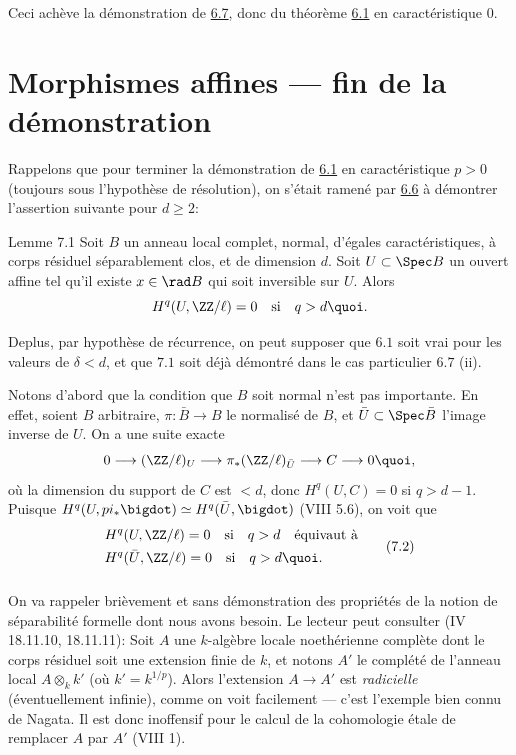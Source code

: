 \documentclass[10pt]{../fichiers-configuration-latex/smfart}
\begin{document}
Ceci achève la démonstration de \hyperref[XIX.lem6.7]{6.7}, donc du théorème \hyperref[XIX.thm6.1]{6.1} en
caractéristique 0.

\section{Morphismes affines --- fin de la démonstration}

Rappelons que pour terminer la démonstration de \hyperref[XIX.thm6.1]{6.1} en caractéristique
$p>0$ (toujours sous l'hypothèse de résolution), on s'était ramené par
\hyperref[XIX.lem6.6]{6.6} à démontrer l'assertion suivante pour $d\geq 2$:

\begin{enonce*}{Lemme 7.1}
Soit $B$ un anneau local complet, normal, d'égales caractéristiques, à
corps résiduel séparablement clos, et de dimension $d$. Soit $U\subset
\Spec B$ un ouvert affine tel qu'il existe $x\in \rad B$ qui soit
inversible sur $U$. Alors 
$$
H^{q}(U,\ZZ/\ell)=0\quad\text{\rm si}\quad q>d{\quoi}.
$$

De\pageoriginale plus, par hypothèse de récurrence, on peut supposer 
que $6.1$ soit vrai pour les valeurs de $\delta<d$, et que $7.1$ soit déjà démontré
dans le cas particulier $6.7$ {\rm (ii)}.
\end{enonce*}

Notons d'abord que la condition que $B$ soit normal n'est pas
importante. En effet, soient $B$ arbitraire, $\pi:\bar{B}\rightarrow
B$ le normalisé de $B$, et $\bar{U}\subset\Spec \bar{B}$ l'image
inverse de $U$. On a une suite exacte
$$
0\longrightarrow (\ZZ/\ell)_{U}\longrightarrow
\pi_{\ast}(\ZZ/\ell)_{\bar{U}}\longrightarrow C\longrightarrow
0{\quoi},
$$
où la dimension du support de $C$ est $<d$, donc $H^{q}(U,C)=0$ si
$q>d-1$. Puisque $H^{q}(U,pi_{\ast}\bigdot)\simeq
H^{q}(\bar{U},\bigdot)$ (VIII 5.6), on voit que
\begin{equation*}
\begin{split}
& H^{q}(U,\ZZ/\ell)=0\quad \text{\rm si}\quad q>d\quad
\text{\rm équivaut à}\\
& H^{q}(\bar{U},\ZZ/\ell)=0\quad\text{\rm si}\quad q>d{\quoi}.
\end{split}\tag{7.2}
\end{equation*}

\setcounter{subsection}{3}
\setcounter{subsubsection}{-1}
\subsubsection{}
On va rappeler brièvement et sans démonstration des propriétés de la
notion de séparabilité formelle dont nous avons besoin. Le lecteur
peut consulter (\EGA IV 18.11.10, 18.11.11): Soit $A$ une $k$-algèbre
locale noethérienne complète dont le corps résiduel soit une extension
finie de $k$, et notons $A'$ le complété de l'anneau local
$A\otimes_{k}k'$ (où $k'=k^{1/p}$). Alors l'extension $A\rightarrow
A'$ est \emph{radicielle} (éventuellement infinie), comme on voit
facilement --- c'est l'exemple bien connu de Nagata. Il est donc
inoffensif pour le calcul de la cohomologie étale de remplacer $A$ par
$A'$ (VIII 1).
\end{document}
